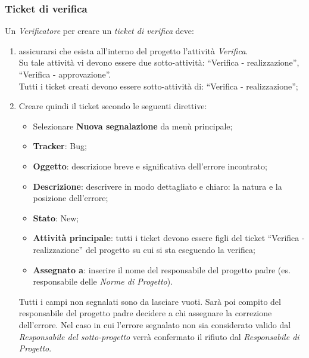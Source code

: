 \documentclass[a4paper,12pt]{article}
\begin{document}
\subsubsection{Ticket di verifica}
{

Un \emph{Verificatore} per creare un \emph{ticket di verifica} deve: 
\begin{enumerate}
\item assicurarsi che esista all’interno del progetto l’attività \emph{Verifica}.\\
Su tale attività vi devono essere due sotto-attività: “Verifica - realizzazione”, 
“Verifica - approvazione”. \\
Tutti i ticket creati devono essere sotto-attività di: “Verifica - realizzazione”; 
\item Creare quindi il ticket secondo le seguenti direttive: 
		\begin{itemize}
		
		
		\item Selezionare \textbf{Nuova segnalazione} da menù principale; 
		\item \textbf{Tracker}: Bug; 
		\item \textbf{Oggetto}: descrizione breve e significativa dell’errore incontrato; 
		\item \textbf{Descrizione}: descrivere in modo dettagliato e chiaro: la natura e la posizione dell’errore; 
		\item \textbf{Stato}: New; 
		\item \textbf{Attività principale}: tutti i ticket devono essere figli del ticket “Verifica - 
		realizzazione” del progetto su cui si sta eseguendo la verifica; 
		\item \textbf{Assegnato a}: inserire il nome del responsabile del progetto padre (es. 
		responsabile delle \emph{Norme di Progetto}). 
		\end{itemize}
Tutti i campi non segnalati sono da lasciare vuoti. 
Sarà poi compito del responsabile del progetto padre decidere a chi assegnare la correzione dell’errore. Nel caso in cui l’errore segnalato non sia considerato valido dal 
\emph{Responsabile del sotto-progetto} verrà confermato il rifiuto dal \emph{Responsabile di Progetto}. 

\end{enumerate}

}
\end{document}
